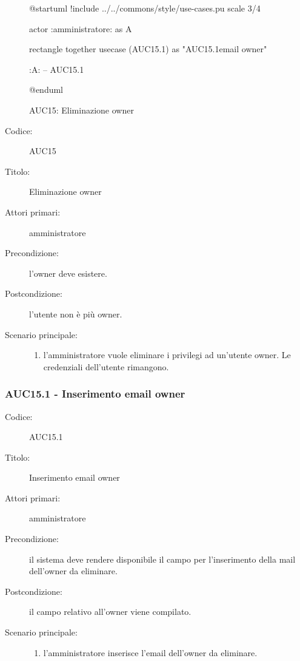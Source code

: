 \documentclass[../../../analisi-dei-requisiti.tex]{subfiles}
\begin{document}
\begin{figure}[h!]
  \centering
  \begin{plantuml}
  @startuml
  !include ../../commons/style/use-cases.pu
  scale 3/4

  actor :amministratore: as A

  rectangle {
    together {
      usecase (AUC15.1) as "AUC15.1\nInserimento email owner"
    }
  }

  :A: -- AUC15.1

  @enduml
  \end{plantuml}
  \caption{AUC15: Eliminazione owner}
  \label{fig:auc15}
\end{figure}

\begin{description}
  \item[Codice:] AUC15
  \item[Titolo:] Eliminazione owner
  \item[Attori primari:] amministratore
  \item[Precondizione:] l'owner deve esistere.
  \item[Postcondizione:] l'utente non è più owner.
  \item[Scenario principale:]
  \begin{enumerate}
    \item l'amministratore vuole eliminare i privilegi ad un'utente owner. Le credenziali dell'utente rimangono.
  \end{enumerate}
\end{description}

\subsubsection{AUC15.1 - Inserimento email owner}%
\label{subsub:AUC15.1}
\begin{description}
  \item[Codice:] AUC15.1
  \item[Titolo:] Inserimento email owner
  \item[Attori primari:] amministratore
  \item[Precondizione:] il sistema deve rendere disponibile il campo per l'inserimento della mail dell'owner da eliminare.
  \item[Postcondizione:] il campo relativo all'owner viene compilato.
  \item[Scenario principale:]
  \begin{enumerate}
    \item l'amministratore inserisce l'email dell'owner da eliminare.
  \end{enumerate}
\end{description}
\end{document}
